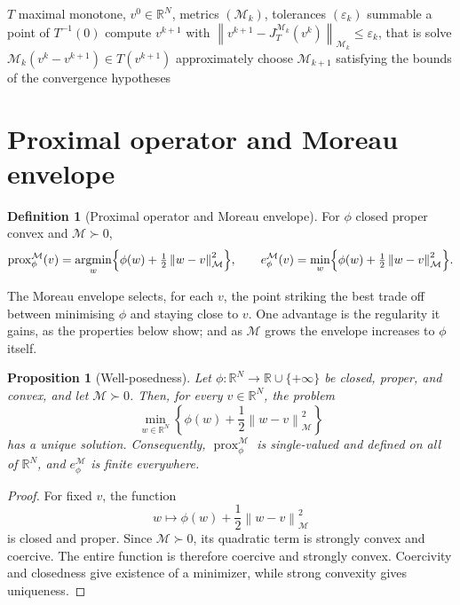 \documentclass[a4paper,11pt]{book}
\theoremstyle{plain}
\newtheorem{proposition}[theorem]{Proposition}
\theoremstyle{definition}
\newtheorem{definition}[theorem]{Definition}
\theoremstyle{remark}
\numberwithin{equation}{chapter}
\numberwithin{algorithm}{chapter}
\newcommand{\R}{\mathbb{R}}
\newcommand{\norm}[1]{\left\|#1\right\|}
\newcommand{\prox}{\operatorname{prox}}
\DeclareMathOperator*{\argmin}{argmin}
\begin{document}
	\begin{algorithm}[H]
		\caption{Variable metric proximal point algorithm}
		\begin{algorithmic}[1]
			\Require $T$ maximal monotone, $v^0\in\R^N$, metrics $(\mathcal{M}_k)$,
			tolerances $(\varepsilon_k)$ summable
			\Ensure a point of $T^{-1}(0)$
			\State compute $v^{k+1}$ with
			$\norm{v^{k+1}-J^{\mathcal{M}_k}_T(v^k)}_{\mathcal{M}_k}\leq\varepsilon_k$,
			that is solve $\mathcal{M}_k(v^k-v^{k+1})\in T(v^{k+1})$ approximately
			\State choose $\mathcal{M}_{k+1}$ satisfying the bounds of the convergence
			hypotheses
			\EndFor
		\end{algorithmic}
	\end{algorithm}
	
	
	\section{Proximal operator and Moreau envelope}
	
	\begin{definition}[Proximal operator and Moreau envelope]
		For $\phi$ closed proper convex and $\mathcal{M}\succ0$,
		\begin{equation}
			\prox^{\mathcal{M}}_{\phi}(v)
			=\argmin_{w}\Bigl\{\phi(w)+\tfrac12\norm{w-v}^2_{\mathcal{M}}\Bigr\},
			\qquad
			e^{\mathcal{M}}_{\phi}(v)
			=\min_{w}\Bigl\{\phi(w)+\tfrac12\norm{w-v}^2_{\mathcal{M}}\Bigr\} .
		\end{equation}
	\end{definition}
	
	The Moreau envelope selects, for each $v$, the point striking the best trade
	off between minimising $\phi$ and staying close to $v$. One advantage is the
	regularity it gains, as the properties below show; and as $\mathcal{M}$ grows
	the envelope increases to $\phi$ itself.
	
	\begin{proposition}[Well-posedness]
		Let \(\phi:\R^N\to\R\cup\{+\infty\}\) be closed, proper, and convex, and let
		\(\mathcal M\succ0\). Then, for every \(v\in\R^N\), the problem
		\[
		\min_{w\in\R^N}
		\left\{
		\phi(w)+\frac12\norm{w-v}_{\mathcal M}^2
		\right\}
		\]
		has a unique solution. Consequently,
		\(\prox_{\phi}^{\mathcal M}\) is single-valued and defined on all of
		\(\R^N\), and \(e_{\phi}^{\mathcal M}\) is finite everywhere.
	\end{proposition}
	
	\begin{proof}
		For fixed \(v\), the function
		\[
		w\longmapsto
		\phi(w)+\frac12\norm{w-v}_{\mathcal M}^2
		\]
		is closed and proper. Since \(\mathcal M\succ0\), its quadratic term is
		strongly convex and coercive. The entire function is therefore coercive and
		strongly convex. Coercivity and closedness give existence of a minimizer,
		while strong convexity gives uniqueness.
	\end{proof}
	
\end{document}
